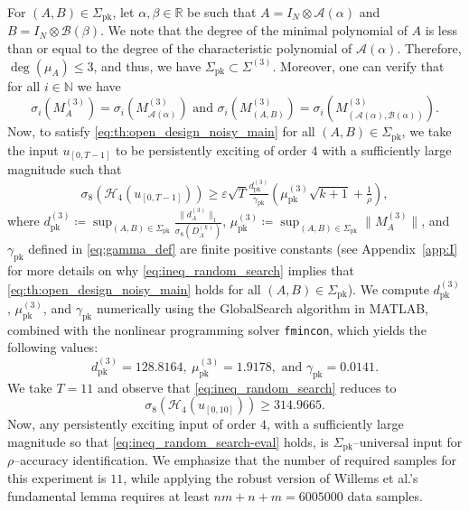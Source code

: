 \documentclass[journal,twoside,web]{ieeecolor}
\DeclareMathOperator{\rad}{rad}
\begin{document}
For $(A,B)\in\Sigma_\text{pk}$, let $\alpha,\beta\in\mathbb{R}$ be such that $A=I_N\otimes \mathcal{A}(\alpha)$ and $B=I_N\otimes \mathcal{B}(\beta)$. We note that the degree of the minimal polynomial of $A$ is less than or equal to the degree of the characteristic polynomial of $\mathcal{A}(\alpha)$.
Therefore, $\deg(\mu_A)\leq 3$, and thus, we have $\Sigma_\text{pk}\subset\Sigma^{(3)}$. Moreover, one can verify that for all $i\in\mathbb{N}$ we have
\begin{equation}
\sigma_i(M_{A}^{(3)})\!=\!\sigma_i(M_{\mathcal{A}(\alpha)}^{(3)}) \text{ and } \sigma_{i}(M_{(A,B)}^{(3)})\!=\!\sigma_{i}(M_{(\mathcal{A}(\alpha),\mathcal{B}(\alpha))}^{(3)}).
\end{equation}
Now, to satisfy \eqref{eq:th:open_design_noisy_main} for all $(A,B)\in\Sigma_\text{pk}$, we take the input $u_{[0,T-1]}$ to be persistently exciting of order $4$ with a sufficiently large magnitude such that 
\begin{equation}
\label{eq:ineq_random_search}
\sigma_{8}(\mathcal{H}_{4}(u_{[0,T-1]}))\geq \varepsilon\sqrt{T}\tfrac{d_\text{pk}^{(3)}}{\gamma_\text{pk}}\left(\mu_\text{pk}^{(3)}\sqrt{k+1}+\tfrac{1}{\rho}\right),
\end{equation}
where $d_\text{pk}^{(3)}\coloneqq {\displaystyle\sup_{(A,B)\in\Sigma_\text{pk}}}\frac{\|d_A^{(3)}\|_1}{\sigma_{8}(D^{(k)}_A)}$, $\mu_\text{pk}^{(3)}\coloneqq {\displaystyle\sup_{(A,B)\in\Sigma_\text{pk}}}\|M_A^{(3)}\|$, and $\gamma_\text{pk}$ defined in \eqref{eq:gamma_def} are finite positive constants (see Appendix~\ref{app:I} for more details on why \eqref{eq:ineq_random_search} implies that \eqref{eq:th:open_design_noisy_main} holds for all $(A,B)\in\Sigma_\text{pk}$). We compute $d_\text{pk}^{(3)}$, $\mu_\text{pk}^{(3)}$, and $\gamma_\text{pk}$ numerically using the GlobalSearch algorithm in MATLAB, combined with the nonlinear programming solver \texttt{fmincon}, which yields the following values:
\begin{equation}
d_\text{pk}^{(3)}=128.8164,\ \mu_\text{pk}^{(3)}=1.9178,\text{ and } \gamma_\text{pk}=0.0141.
\end{equation}
We take $T=11$ and observe that \eqref{eq:ineq_random_search} reduces to
\begin{equation}
\label{eq:ineq_random_search-eval}
\sigma_{8}(\mathcal{H}_{4}(u_{[0,10]}))\geq 314.9665.
\end{equation}
Now, any persistently exciting input of order $4$, with a sufficiently large magnitude so that \eqref{eq:ineq_random_search-eval} holds, is $\Sigma_\text{pk}$--universal input for $\rho$--accuracy identification. We emphasize that the number of required samples for this experiment is $11$, while applying the robust version of Willems et al.'s fundamental lemma \cite{coulson2022quantitative} requires at least $nm+n+m=6005000$ data samples. %
\end{document}
